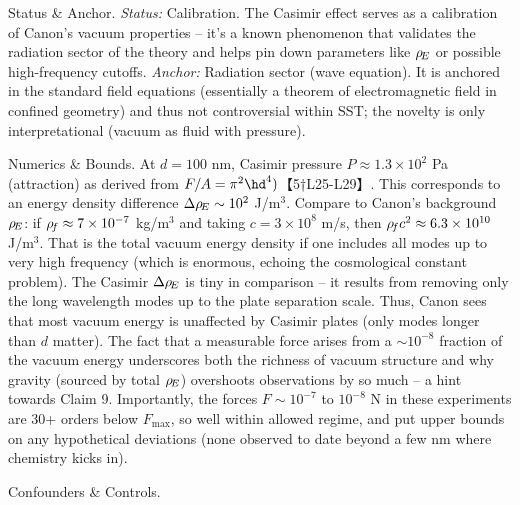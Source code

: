 \documentclass[11pt]{article}
\begin{document}
Status & Anchor. \textit{Status:} Calibration. The Casimir effect serves as a calibration of Canon’s vacuum properties – it’s a known phenomenon that validates the radiation sector of the theory and helps pin down parameters like $\rho_{\!E}$ or possible high-frequency cutoffs. \textit{Anchor:} Radiation sector (wave equation). It is anchored in the standard field equations (essentially a theorem of electromagnetic field in confined geometry) and thus not controversial within SST; the novelty is only interpretational (vacuum as fluid with pressure).


Numerics & Bounds. At $d=100$ nm, Casimir pressure $P \approx 1.3\times10^2$ Pa (attraction) as derived from $F/A = \pi^2 \hd^4)$【5†L25-L29】. This corresponds to an energy density difference $\Delta \rho_{\!E} \sim 10^2$ J/m$^3$. Compare to Canon’s background $\rho_{\!E}$: if $\rho_{\!f} \approx 7\times10^{-7}$ kg/m$^3$ and taking $c=3\times10^8$ m/s, then $\rho_{\!f} c^2 \approx 6.3\times10^{10}$ J/m$^3$. That is the total vacuum energy density if one includes all modes up to very high frequency (which is enormous, echoing the cosmological constant problem). The Casimir $\Delta \rho_{\!E}$ is tiny in comparison – it results from removing only the long wavelength modes up to the plate separation scale. Thus, Canon sees that most vacuum energy is unaffected by Casimir plates (only modes longer than $d$ matter). The fact that a measurable force arises from a $\sim10^{-8}$ fraction of the vacuum energy underscores both the richness of vacuum structure and why gravity (sourced by total $\rho_{\!E}$) overshoots observations by so much – a hint towards Claim 9. Importantly, the forces $F \sim 10^{-7}$ to $10^{-8}$ N in these experiments are 30+ orders below $F_{\max}$, so well within allowed regime, and put upper bounds on any hypothetical deviations (none observed to date beyond a few nm where chemistry kicks in).


Confounders & Controls.
\end{document}
